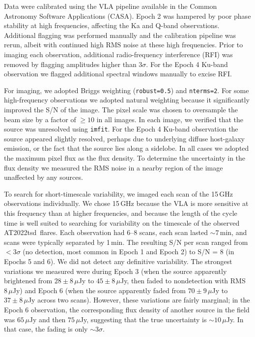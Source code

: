 \documentclass{nature_plusfigure}
\newcommand{\at}{AT2022tsd}
\begin{document}
\begin{methods}
Data were calibrated using the VLA pipeline available in the Common Astronomy Software Applications (CASA\cite{McMullin2007}).
Epoch 2 was hampered by poor phase stability at high frequencies, affecting the Ka and Q-band observations. Additional flagging was performed manually and the calibration pipeline was rerun, albeit with continued high RMS noise at these high frequencies.
Prior to imaging each observation, additional radio-frequency interference (RFI) was removed by flagging amplitudes higher than $3\sigma$.
For the Epoch 4 Ku-band observation we flagged additional spectral windows manually to excise RFI.

For imaging, we adopted Briggs weighting (\texttt{robust=0.5}) and \texttt{nterms=2}. For some high-frequency observations we adopted natural weighting because it significantly improved the S/N of the image.
The pixel scale was chosen to oversample the beam size by a factor of $\geq10$ in all images.
In each image, we verified that the source was unresolved using \texttt{imfit}.
For the Epoch 4 Ku-band observation the source appeared slightly resolved, perhaps due to underlying diffuse host-galaxy emission, or the fact that the source lies along a sidelobe.
In all cases we adopted the maximum pixel flux as the flux density.
To determine the uncertainty in the flux density we measured the RMS noise in a nearby region of the image unaffected by any sources.

To search for short-timescale variability, we imaged each scan of the 15\,GHz observations individually. We chose 15\,GHz because the VLA is more sensitive at this frequency than at higher frequencies, and because the length of the cycle time is well suited to searching for variability on the timescale of the observed \at\ flares. Each observation had 6--8 scans, each scan lasted $\sim 7$\,min, and scans were typically separated by 1\,min. The resulting S/N per scan ranged from $<3\sigma$ (no detection, most common in Epoch 1 and Epoch 2) to S/N = 8 (in Epochs 5 and 6).
We did not detect any definitive variability. The strongest variations we measured were during Epoch 3 (when the source apparently brightened from $28\pm8\,\mu$Jy to $45\pm8\,\mu$Jy, then faded to nondetection with RMS $8\,\mu$Jy) and Epoch 6 (when the source apparently faded from $70\pm9\,\mu$Jy to $37\pm8\,\mu$Jy across two scans). However, these variations are fairly marginal; in the Epoch 6 observation, the corresponding flux density of another source in the field was $65\,\mu$Jy and then $75\,\mu$Jy, suggesting that the true uncertainty is $\sim 10\,$$\mu$Jy. In that case, the fading is only $\sim 3\sigma$.


\end{methods}
\end{document}
